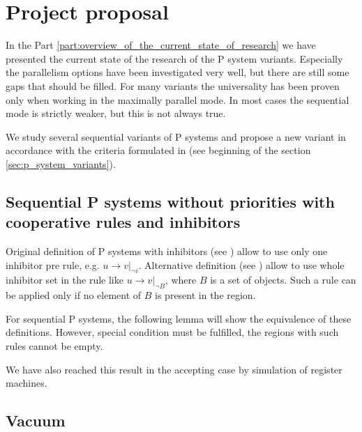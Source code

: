 \chapter{Project proposal} %
\label{cha:project_proposal}

In the Part \ref{part:overview_of_the_current_state_of_research} we have presented the current state of the research of the P system variants. Especially the parallelism options have been investigated very well, but there are still some gaps that should be filled. For many variants the universality has been proven only when working in the maximally parallel mode. In most cases the sequential mode is strictly weaker, but this is not always true.

We study several sequential variants of P systems and propose a new variant in accordance with the criteria formulated in \cite{Besozzi:PhD:2004} (see beginning of the section \ref{sec:p_system_variants}).

\section{Sequential P systems without priorities with cooperative rules and inhibitors} %
\label{sec:sequential_p_systems_without_priorities_with_cooperative_rules_and_inhibitors}

Original definition of P systems with inhibitors (see \cite{Ionescu:jucs_10_5:on_p_systems_with}) allow to use only one inhibitor pre rule, e.g. $u\rightarrow v|_{\neg i}$. Alternative definition (see \cite{Agrigoroaiei:2010:Dissolution}) allow to use whole inhibitor set in the rule like $u\rightarrow v|_{\neg B}$, where $B$ is a set of objects. Such a rule can be applied only if no element of $B$ is present in the region.

For sequential P systems, the following lemma will show the equivalence of these definitions. However, special condition must be fulfilled, the regions with such rules cannot be empty.



We have also reached this result in the accepting case by simulation of register machines.




\section{Vacuum} %
\label{sec:vacuum}

